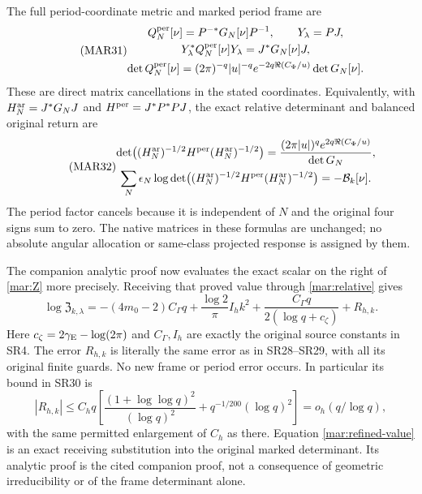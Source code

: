 \documentclass[11pt]{article}
\begin{document}
The full period-coordinate metric and marked period frame are
\begin{equation}\tag{MAR31}\label{mar:periodmetric}
 \begin{gathered}
 Q_N^{\rm per}[\nu]=P^{-*}G_N[\nu]P^{-1},\qquad Y_\lambda=PJ,\\
 Y_\lambda^*Q_N^{\rm per}[\nu]Y_\lambda=J^*G_N[\nu]J,\\
 \det Q_N^{\rm per}[\nu]
  =(2\pi)^{-q}|u|^{-q}e^{-2q\Re(C_\Phi/u)}\det G_N[\nu].
 \end{gathered}
\end{equation}
These are direct matrix cancellations in the stated coordinates.
Equivalently, with $H_N^{\rm ar}=J^*G_NJ$ and
$H^{\rm per}=J^*P^*PJ$, the exact relative determinant and
balanced original return are
\begin{equation}\tag{MAR32}\label{mar:periodreturn}
 \begin{gathered}
 \det\bigl((H_N^{\rm ar})^{-1/2}H^{\rm per}(H_N^{\rm ar})^{-1/2}\bigr)
 =\frac{(2\pi|u|)^q e^{2q\Re(C_\Phi/u)}}{\det G_N},\\
 \sum_N\epsilon_N\log\det\bigl((H_N^{\rm ar})^{-1/2}
                 H^{\rm per}(H_N^{\rm ar})^{-1/2}\bigr)
              =-\mathcal B_k[\nu].
 \end{gathered}
\end{equation}
The period factor cancels because it is independent of $N$ and
the original four signs sum to zero. The native matrices in
these formulas are unchanged; no absolute angular allocation or
same-class projected response is assigned by them.

The companion analytic proof \cite[SR28--SR30]{signed} now evaluates
the exact scalar on the right of \eqref{mar:Z} more precisely.
Receiving that proved value through \eqref{mar:relative} gives
\begin{equation}\tag{MAR33}\label{mar:refined-value}
 \log\mathfrak Z_{k,\lambda}
 =-(4m_0-2)C_\Gamma q+\frac{\log2}{\pi}I_hk^2
       +\frac{C_\Gamma q}{2(\log q+c_\zeta)}+R_{h,k}.
\end{equation}
Here $c_\zeta=2\gamma_{\rm E}-\log(2\pi)$ and $C_\Gamma,I_h$
are exactly the original source constants in SR4. The error
$R_{h,k}$ is literally the same error as in SR28--SR29, with all
its original finite guards. No new frame or period error occurs.
In particular its bound in SR30 is
\[
 |R_{h,k}|\le C_h q\left[
 \frac{(1+\log\log q)^2}{(\log q)^2}
             +q^{-1/200}(\log q)^2\right]=o_h(q/\log q),
\]
with the same permitted enlargement of $C_h$ as there.
Equation \eqref{mar:refined-value} is an exact receiving
substitution into the original marked determinant. Its analytic
proof is the cited companion proof, not a consequence of
geometric irreducibility or of the frame determinant alone.
\end{document}
